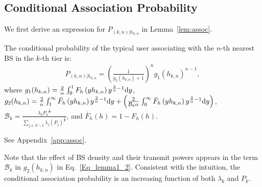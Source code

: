 \documentclass[final]{IEEEtran}
\begin{document}
\subsection{Conditional Association Probability}
We first derive an expression for $P_{(k,n)|h_{k,n}}$ in Lemma~\ref{lem:assoc}. 
\begin{lemma}\label{lem:assoc}
The conditional probability of the typical user associating with the $n$-th nearest BS in the $k$-th tier is:
\begin{align}
\label{Eq_lemma1_2}
P_{(k,n)|h_{k,n}}=\left(\frac{1}{g_2(h_{k,n})+1}\right)^ng_1(h_{k,n})^{n-1},
\end{align}
where $g_1(h_{k,n})=\frac{2}{\alpha}\int_{0}^{1}F_h\left(yh_{k,n}\right)y^{\frac{2}{\alpha}-1}{\rm d}y$, $g_2(h_{k,n})=\frac{2}{\alpha}\int_{1}^{\infty}\bar{F}_h\left(yh_{k,n}\right)y^{\frac{2}{\alpha}-1}{\rm d}y+\Big(\frac{2}{\mathcal{B}_k\alpha}\int_{0}^{\infty}\bar{F}_h\left(yh_{k,n}\right)y^{\frac{2}{\alpha}-1}{\rm d}y\Big)$, ${\mathcal{B}_k}=\frac{{\lambda_k}{P_k}^{\frac{2}{\alpha}}}{\sum_{j\in\mathcal{K}\backslash k}{\lambda_j}\left({P_j}\right)^{\frac{2}{\alpha}}}$, and $\bar{F}_h(h)=1-F_h(h)$.   
\end{lemma}
\begin{IEEEproof}
See Appendix~\ref{app:assoc}.
\end{IEEEproof} 
\begin{remark} \label{rem:Bias_term}
Note that the effect of BS density and their transmit powers appears in the term ${\mathcal{B}_k}$ in $g_2(h_{k,n})$ in Eq.~\ref{Eq_lemma1_2}. Consistent with the intuition, the conditional association probability is an increasing function of both $\lambda_k$ and $P_k$. %
\end{remark}
\end{document}
